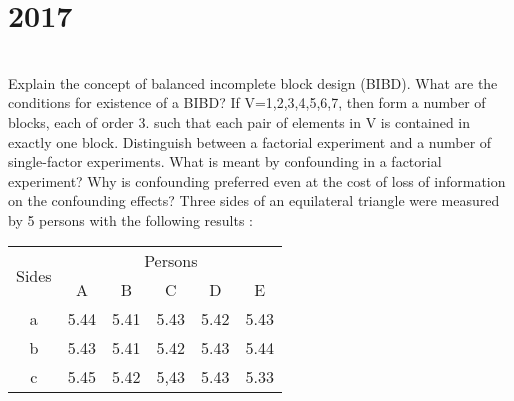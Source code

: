 \section*{2017}
\vspace{-.5cm}
\hrulefill \smallskip\\
 Explain the concept of balanced incomplete block design (BIBD). What are the conditions for existence of a BIBD? If V={1,2,3,4,5,6,7}, then form a number of blocks, each of order 3. such that each pair of elements in V is contained in exactly one block.
\myline
{} Distinguish between a factorial experiment and a number of single-factor experiments. What is meant by confounding in a factorial experiment? Why is confounding preferred even at the cost of loss of information on the confounding effects?
\myline
{} Three sides of an equilateral triangle were measured by 5 persons with the following results :
\begin{center}
    \begin{tabular}{|*{6}{c|}} \hline
        \multirow{2}{*}{Sides} & \multicolumn{5}{c|}{Persons}\\ \cline{2-6}
        & A & B & C & D & E \\ \hline
        a & 5.44 & 5.41 & 5.43 & 5.42 & 5.43 \\ \hline
        b & 5.43 & 5.41 & 5.42 & 5.43 & 5.44 \\ \hline
        c & 5.45 & 5.42 & 5,43 & 5.43 & 5.33 \\ \hline
    \end{tabular}
\end{center}
